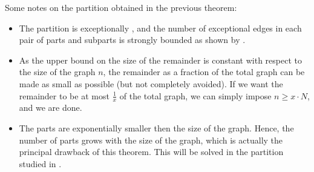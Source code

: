         \begin{remark}
            Some notes on the partition obtained in the previous theorem:
            \begin{itemize}
                \item The partition is exceptionally \regular, and the number of exceptional edges in each pair of parts
                    and subparts is strongly bounded as shown by .
                \item As the upper bound on the size of the remainder is constant with respect to the size of the graph $n$,
                    the remainder as a fraction of the total graph can be made as small as possible (but not completely avoided).
                    If we want the remainder to be at most $\frac{1}{x}$ of the total graph, we can simply impose
                    $n \geq x \cdot N$, and we are done.
                \item The parts are exponentially smaller then the size of the graph.
                    Hence, the number of parts grows with the size of the graph, which is actually the principal drawback of
                    this theorem.
                    This will be solved in the partition studied in .
            \end{itemize}
        \end{remark}

